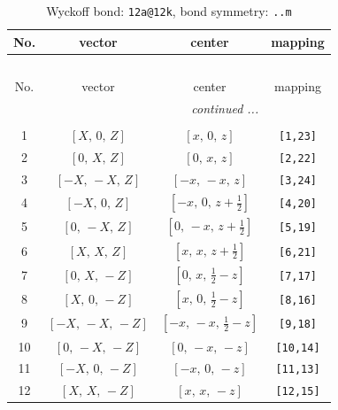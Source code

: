 \documentclass[fleqn,8pt]{jsarticle}
\begin{document}
\begin{longtable}{cccc}
\caption{Wyckoff bond: {\tt 12a@12k}, bond symmetry: {\tt ..m}}
 \\
 \hline \hline
No. & vector & center & mapping \\ \hline \endfirsthead

\multicolumn{3}{l}{\tablename\ \thetable{}} \\
 \hline \hline
No. & vector & center & mapping \\ \hline \endhead

 \hline \hline
\multicolumn{3}{r}{\footnotesize\it continued ...} \\ \endfoot

 \hline \hline
\multicolumn{3}{r}{} \\ \endlastfoot

1 & $\left[ X,\, 0,\, Z \right]$ & $\left[ x,\, 0,\, z \right]$ & {\tt [1,23]} \\ \hline
2 & $\left[ 0,\, X,\, Z \right]$ & $\left[ 0,\, x,\, z \right]$ & {\tt [2,22]} \\ \hline
3 & $\left[ - X,\, - X,\, Z \right]$ & $\left[ - x,\, - x,\, z \right]$ & {\tt [3,24]} \\ \hline
4 & $\left[ - X,\, 0,\, Z \right]$ & $\left[ - x,\, 0,\, z + \frac{1}{2} \right]$ & {\tt [4,20]} \\ \hline
5 & $\left[ 0,\, - X,\, Z \right]$ & $\left[ 0,\, - x,\, z + \frac{1}{2} \right]$ & {\tt [5,19]} \\ \hline
6 & $\left[ X,\, X,\, Z \right]$ & $\left[ x,\, x,\, z + \frac{1}{2} \right]$ & {\tt [6,21]} \\ \hline
7 & $\left[ 0,\, X,\, - Z \right]$ & $\left[ 0,\, x,\, \frac{1}{2} - z \right]$ & {\tt [7,17]} \\ \hline
8 & $\left[ X,\, 0,\, - Z \right]$ & $\left[ x,\, 0,\, \frac{1}{2} - z \right]$ & {\tt [8,16]} \\ \hline
9 & $\left[ - X,\, - X,\, - Z \right]$ & $\left[ - x,\, - x,\, \frac{1}{2} - z \right]$ & {\tt [9,18]} \\ \hline
10 & $\left[ 0,\, - X,\, - Z \right]$ & $\left[ 0,\, - x,\, - z \right]$ & {\tt [10,14]} \\ \hline
11 & $\left[ - X,\, 0,\, - Z \right]$ & $\left[ - x,\, 0,\, - z \right]$ & {\tt [11,13]} \\ \hline
12 & $\left[ X,\, X,\, - Z \right]$ & $\left[ x,\, x,\, - z \right]$ & {\tt [12,15]} \\
\end{longtable}
\renewcommand{\arraystretch}{1.2}
\end{document}
